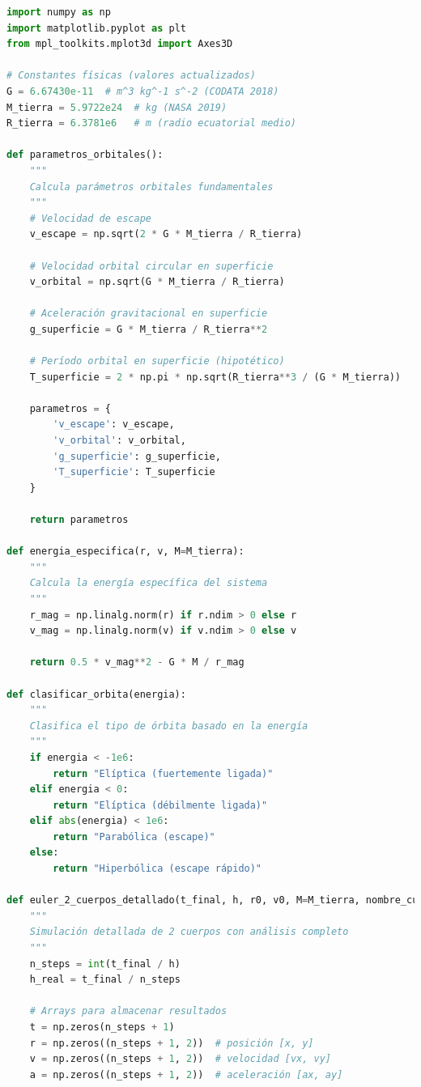 \documentclass{article}
\begin{document}
	\begin{lstlisting}[language=Python, caption={Análisis completo del sistema Tierra-nave}]
import numpy as np
import matplotlib.pyplot as plt
from mpl_toolkits.mplot3d import Axes3D

# Constantes físicas (valores actualizados)
G = 6.67430e-11  # m^3 kg^-1 s^-2 (CODATA 2018)
M_tierra = 5.9722e24  # kg (NASA 2019)
R_tierra = 6.3781e6   # m (radio ecuatorial medio)

def parametros_orbitales():
    """
    Calcula parámetros orbitales fundamentales
    """
    # Velocidad de escape
    v_escape = np.sqrt(2 * G * M_tierra / R_tierra)
    
    # Velocidad orbital circular en superficie
    v_orbital = np.sqrt(G * M_tierra / R_tierra)
    
    # Aceleración gravitacional en superficie
    g_superficie = G * M_tierra / R_tierra**2
    
    # Período orbital en superficie (hipotético)
    T_superficie = 2 * np.pi * np.sqrt(R_tierra**3 / (G * M_tierra))
    
    parametros = {
        'v_escape': v_escape,
        'v_orbital': v_orbital,
        'g_superficie': g_superficie,
        'T_superficie': T_superficie
    }
    
    return parametros

def energia_especifica(r, v, M=M_tierra):
    """
    Calcula la energía específica del sistema
    """
    r_mag = np.linalg.norm(r) if r.ndim > 0 else r
    v_mag = np.linalg.norm(v) if v.ndim > 0 else v
    
    return 0.5 * v_mag**2 - G * M / r_mag

def clasificar_orbita(energia):
    """
    Clasifica el tipo de órbita basado en la energía
    """
    if energia < -1e6:
        return "Elíptica (fuertemente ligada)"
    elif energia < 0:
        return "Elíptica (débilmente ligada)"
    elif abs(energia) < 1e6:
        return "Parabólica (escape)"
    else:
        return "Hiperbólica (escape rápido)"

def euler_2_cuerpos_detallado(t_final, h, r0, v0, M=M_tierra, nombre_cuerpo="Tierra"):
    """
    Simulación detallada de 2 cuerpos con análisis completo
    """
    n_steps = int(t_final / h)
    h_real = t_final / n_steps
    
    # Arrays para almacenar resultados
    t = np.zeros(n_steps + 1)
    r = np.zeros((n_steps + 1, 2))  # posición [x, y]
    v = np.zeros((n_steps + 1, 2))  # velocidad [vx, vy]
    a = np.zeros((n_steps + 1, 2))  # aceleración [ax, ay]
    

\end{lstlisting}
\end{document}
